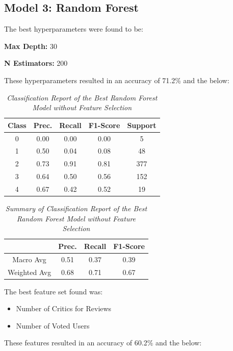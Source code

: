 \documentclass[11pt]{article}
\begin{document}
\subsection{Model 3: Random Forest}
The best hyperparameters were found to be:

\textbf{Max Depth: } 30

\textbf{N Estimators: } 200

\noindent
These hyperparameters resulted in an accuracy of 71.2\% and the below:

\begin{table}[!ht]
    \begin{center}
        \begin{tabular}{c|c|c|c|c}			
            \hline
            Class & Prec. & Recall & F1-Score & Support \\
            \hline\hline
            0 & 0.00 & 0.00 & 0.00 & 5 \\
            1 & 0.50 & 0.04 & 0.08 & 48 \\
            2 & 0.73 & 0.91 & 0.81 & 377 \\
            3 & 0.64 & 0.50 & 0.56 & 152 \\
            4 & 0.67 & 0.42 & 0.52 & 19\\
                \hline
        \end{tabular}

        \caption{\textit{Classification Report of the Best Random Forest Model without Feature Selection}}
        \label{rf-report}

    \end{center}
\end{table}
\begin{table}[!ht]
    \begin{center}
        \begin{tabular}{c||c|c|c}			
            \hline
             & Prec. & Recall & F1-Score \\
            \hline\hline
            Macro Avg & 0.51 & 0.37 & 0.39 \\
            Weighted Avg & 0.68 & 0.71 & 0.67 \\
                \hline
        \end{tabular}

        \caption{\textit{Summary of Classification Report of the Best Random Forest Model without Feature Selection}}
        \label{rf-report-sum}

    \end{center}
\end{table}
\noindent
The best feature set found was:
\begin{itemize}
    \item Number of Critics for Reviews
    \item Number of Voted Users
\end{itemize}
\noindent
These features resulted in an accuracy of 60.2\% and the below:
\end{document}
